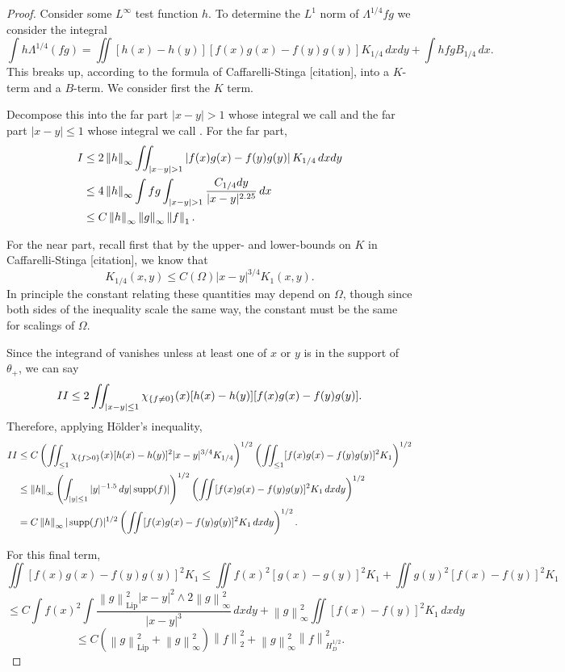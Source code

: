 \documentclass[11pt]{amsart}
\theoremstyle{remark}
\theoremstyle{definition}
\newcommand{\norm}[1]{\left\lVert#1\right\rVert}
\newcommand{\paren}[1]{\left( #1 \right)}
\newcommand{\abs}[1]{\left\lvert #1 \right\rvert}
\DeclareMathOperator{\supp}{supp}
\newcommand{\Lip}{\text{Lip}}
\newcommand{\indic}[1]{\chi_{\{#1\}}}
\newcommand{\Rom}[1]{\MakeUppercase{\romannumeral #1}}
\begin{document}
\begin{proof}
Consider some $L^\infty$ test function $h$.  To determine the $L^1$ norm of $\Lambda^{1/4} fg$ we consider the integral
\[ \int h \Lambda^{1/4} (fg) = \iint [h(x)-h(y)][f(x)g(x) - f(y)g(y)] K_{1/4} \,dxdy + \int hfg B_{1/4} \,dx. \]
This breaks up, according to the formula of Caffarelli-Stinga [citation], into a $K$-term and a $B$-term.  We consider first the $K$ term.  

Decompose this into the far part $|x-y|>1$ whose integral we call \Rom{1} and the far part $|x-y|\leq 1$ whose integral we call \Rom{2}.  For the far part,
\begin{align*} 
\Rom{1} &\leq 2 \norm{h}_\infty \iint_{|x-y|>1} \abs{f(x)g(x)-f(y)g(y)} K_{1/4} \,dxdy
\\ &\leq 4 \norm{h}_\infty \int fg \int_{|x-y|>1} \frac{C_{1/4} dy}{|x-y|^{2.25}} \,dx
\\ &\leq C \norm{h}_\infty \norm{g}_\infty  \norm{f}_1.
\end{align*}

For the near part, recall first that by the upper- and lower-bounds on $K$ in Caffarelli-Stinga [citation], we know that
\[ K_{1/4}(x,y) \leq C(\Omega) |x-y|^{3/4} K_1(x,y). \]
In principle the constant relating these quantities may depend on $\Omega$, though since both sides of the inequality scale the same way, the constant must be the same for scalings of $\Omega$.  

Since the integrand of \Rom{2} vanishes unless at least one of $x$ or $y$ is in the support of $\theta_+$, we can say
\[ \Rom{2} \leq 2 \iint_{|x-y|\leq 1} \indic{f\neq0}(x) [h(x)-h(y)][f(x)g(x)-f(y)g(y)]. \]
Therefore, applying H\"{o}lder's inequality,
\begin{align*}
\Rom{2} &\leq C \paren{\iint _{\leq 1} \indic{f>0}(x) [h(x)-h(y)]^2 |x-y|^{3/4} K_{1/4}}^{1/2} \paren{\iint_{\leq 1} [f(x)g(x) - f(y)g(y)]^2 K_1}^{1/2}
\\ &\leq \norm{h}_\infty \paren{\int_{|y|\leq 1} |y|^{-1.5} \,dy |\supp(f)|}^{1/2} \paren{ \iint [f(x)g(x)-f(y)g(y)]^2 K_1 \,dxdy}^{1/2}
\\ &= C\norm{h}_\infty |\supp(f)|^{1/2} \paren{\iint [f(x)g(x)-f(y)g(y)]^2 K_1 \,dxdy}^{1/2}.
\end{align*}

For this final term,
\[ \iint [f(x)g(x)-f(y)g(y)]^2 K_1 \leq \iint f(x)^2 [g(x)-g(y)]^2 K_1 + \iint g(y)^2[f(x)-f(y)]^2 K_1 \]
\[ \leq C \int f(x)^2 \int \frac{\norm{g}_\Lip^2|x-y|^2 \wedge 2 \norm{g}_\infty^2 }{|x-y|^3} \,dxdy + \norm{g}_\infty^2 \iint [f(x)-f(y)]^2 K_1 \,dxdy \]
\[ \leq C(\norm{g}_\Lip^2 + \norm{g}_\infty^2) \norm{f}_2^2 + \norm{g}_\infty^2  \norm{f}_{H_D^{1/2}}^2. \]


\end{proof}
\end{document}
